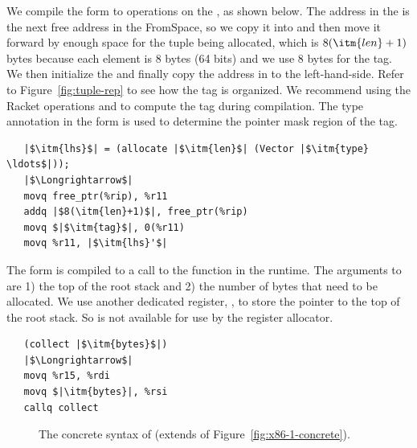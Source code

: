 \documentclass[11pt]{book}
\newcommand{\gray}[1]{{\color{gray} #1}}
\begin{document}
We compile the  form to operations on the
, as shown below. The address in the 
is the next free address in the FromSpace, so we copy it into
 and then move it forward by enough space for the tuple
being allocated, which is $8(\itm{len}+1)$ bytes because each element
is 8 bytes (64 bits) and we use 8 bytes for the tag.  We then
initialize the  and finally copy the address in  to
the left-hand-side. Refer to Figure~\ref{fig:tuple-rep} to see how the
tag is organized. We recommend using the Racket operations
 and  to compute the tag
during compilation.  The type annotation in the  form is
used to determine the pointer mask region of the tag.
\begin{lstlisting}
   |$\itm{lhs}$| = (allocate |$\itm{len}$| (Vector |$\itm{type} \ldots$|));
   |$\Longrightarrow$|
   movq free_ptr(%rip), %r11
   addq |$8(\itm{len}+1)$|, free_ptr(%rip)
   movq $|$\itm{tag}$|, 0(%r11)
   movq %r11, |$\itm{lhs}'$|
\end{lstlisting}

The  form is compiled to a call to the 
function in the runtime. The arguments to  are 1) the
top of the root stack and 2) the number of bytes that need to be
allocated.  We use another dedicated register, , to
store the pointer to the top of the root stack. So  is not
available for use by the register allocator.
\begin{lstlisting}
   (collect |$\itm{bytes}$|)
   |$\Longrightarrow$|
   movq %r15, %rdi
   movq $|\itm{bytes}|, %rsi
   callq collect
\end{lstlisting}



\begin{figure}[tp]
\fbox{
\begin{minipage}{0.96\textwidth}
\[
\begin{array}{lcl}
  \Arg &::=& \gray{ \key{\$}\Int \mid \key{\%}\Reg \mid \Int\key{(}\key{\%}\Reg\key{)} \mid \key{\%}\itm{bytereg} } \mid \Var \key{(\%rip)} \\
\LangXGlobal{} &::= & \gray{ \key{.globl main} }\\
      &    & \gray{ \key{main:} \; \Instr\ldots }
\end{array}
\]
\end{minipage}
}
\caption{The concrete syntax of \LangXGlobal{}  (extends \LangXIf{} of Figure~\ref{fig:x86-1-concrete}).}
\label{fig:x86-2-concrete}
\end{figure}
\end{document}
